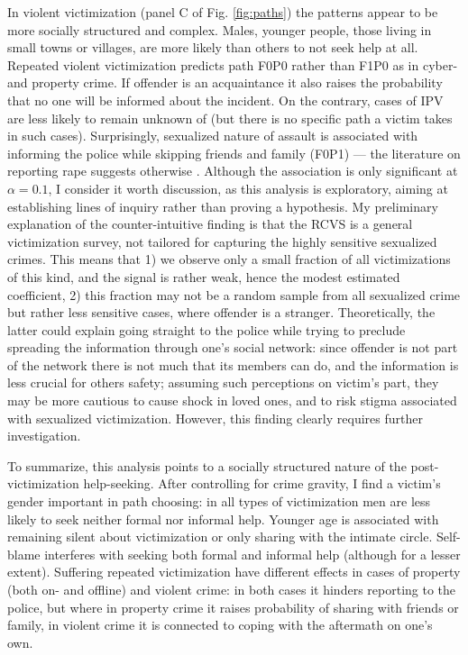 \documentclass[]{interact}
\theoremstyle{plain}%
\theoremstyle{definition}
\theoremstyle{remark}
\newcommand\citep{\parencite}
\begin{document}
	In violent victimization (panel C of Fig. \ref{fig:paths}) the patterns appear to be more socially structured and complex. Males, younger people, those living in small towns or villages, are more likely than others to not seek help at all. Repeated violent victimization predicts path F0P0 rather than F1P0 as in cyber- and property crime. If offender is an acquaintance it also raises the probability that no one will be informed about the incident. On the contrary, cases of IPV are less likely to remain unknown of (but there is no specific path a victim takes in such cases). Surprisingly, sexualized nature of assault is associated with informing the police while skipping friends and family (F0P1) --- the literature on reporting rape suggests otherwise \citep{garcia2005multi, kamalov2023partnerskoye, baert2024factors}. Although the association is only significant at $\alpha = 0.1$, I consider it worth discussion, as this analysis is exploratory, aiming at establishing lines of inquiry rather than proving a hypothesis. My preliminary explanation of the counter-intuitive finding is that the RCVS is a general victimization survey, not tailored for capturing the highly sensitive sexualized crimes. This means that 1) we observe only a small fraction of all victimizations of this kind, and the signal is rather weak, hence the modest estimated coefficient, 2) this fraction may not be a random sample from all sexualized crime but rather less sensitive cases, where offender is a stranger. Theoretically, the latter could explain going straight to the police while trying to preclude spreading the information through one's social network: since offender is not part of the network there is not much that its members can do, and the information is less crucial for others safety; assuming such perceptions on victim's part, they may be more cautious to cause shock in loved ones, and to risk stigma associated with sexualized victimization. However, this finding clearly requires further investigation.
	
	To summarize, this analysis points to a socially structured nature of the post-victimization help-seeking. After controlling for crime gravity, I find a victim's gender important in path choosing: in all types of victimization men are less likely to seek neither formal nor informal help. Younger age is associated with remaining silent about victimization or only sharing with the intimate circle. Self-blame interferes with seeking both formal and informal help (although for a lesser extent). Suffering repeated victimization have different effects in cases of property (both on- and offline) and violent crime: in both cases it hinders reporting to the police, but where in property crime it raises probability of sharing with friends or family, in violent crime it is connected to coping with the aftermath on one's own.   
	
\end{document}
